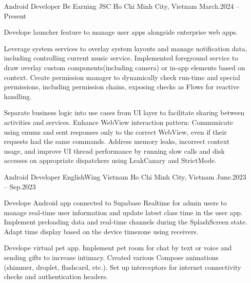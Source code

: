 \begin{cventries}

    \cventry
    {Android Developer}
    {Be Earning JSC}
    {Ho Chi Minh City, Vietnam}
    {March.2024 -- Present}
    {
        \begin{cvitems}

            \item {
                Develope launcher feature to manage user apps alongside enterprise web apps.
            }

            \item {
                Leverage system services to overlay system layouts and manage notification data, including controlling current music service.
                Implemented foreground service to draw overlay custom components(including camera) or in-app elements based on context.
                Create permission manager to dynamically check run-time and special permissions, including permission chains, exposing checks as Flows for reactive handling.
            }

            \item {
                Separate business logic into use cases from UI layer to facilitate sharing between activities and services.
                Enhance WebView interaction pattern: Communicate using enums and sent responses only to the correct WebView, even if their requests had the same commands.
                Address memory leaks, incorrect context usage, and improve UI thread performance by running slow calls and disk accesses on appropriate dispatchers using LeakCanary and StrictMode.
            }

        \end{cvitems}
    }

    \cventry
    {Android Developer}
    {EnglishWing Vietnam}
    {Ho Chi Minh City, Vietnam}
    {June.2023 -- Sep.2023}
    {
        \begin{cvitems}

            \item {
                Develope Android app connected to Supabase Realtime for admin users to manage real-time user information and update latest class time in the user app.
                Implement preloading data and real-time channels during the SplashScreen state.
                Adapt time display based on the device timezone using receivers.
            }

            \item {
                Develope virtual pet app.
                Implement pet room for chat by text or voice and sending gifts to increase intimacy.
                Created various Compose animations (shimmer, droplet, flashcard, etc.).
                Set up interceptors for internet connectivity checks and authentication headers.
            }

        \end{cvitems}
    }

\end{cventries}

